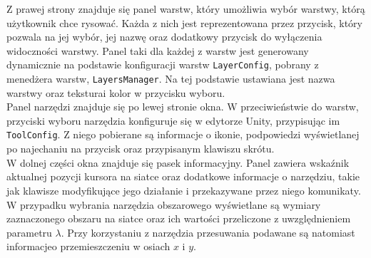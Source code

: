 Z prawej strony znajduje się panel warstw, który umożliwia wybór warstwy, którą użytkownik chce rysować.
Każda z nich jest reprezentowana przez przycisk, który pozwala na jej wybór,
jej nazwę oraz dodatkowy przycisk do wyłączenia widoczności warstwy.
Panel taki dla każdej z warstw jest generowany dynamicznie na podstawie konfiguracji warstw \texttt{LayerConfig},
pobrany z menedżera warstw, \texttt{LayersManager}.
Na tej podstawie ustawiana jest nazwa warstwy oraz tekstura\linebreak i kolor w przycisku wyboru.\\
Panel narzędzi znajduje się po lewej stronie okna.
W przeciwieństwie do warstw, przyciski wyboru narzędzia konfiguruje się w edytorze Unity,
przypisując im \texttt{ToolConfig}.
Z niego pobierane są informacje o ikonie,
podpowiedzi wyświetlanej po najechaniu na przycisk oraz przypisanym klawiszu skrótu.\\
\indent W dolnej części okna znajduje się pasek informacyjny.
Panel zawiera wskaźnik aktualnej pozycji kursora na siatce oraz dodatkowe informacje o narzędziu,
takie jak klawisze modyfikujące jego działanie i przekazywane przez niego komunikaty.
W przypadku wybrania narzędzia obszarowego wyświetlane są wymiary zaznaczonego obszaru na siatce
oraz ich wartości przeliczone z uwzględnieniem parametru $\lambda$.
Przy korzystaniu z narzędzia przesuwania podawane są natomiast informacje\linebreak o przemieszczeniu w osiach $x$ i $y$.
